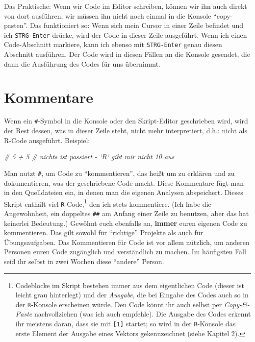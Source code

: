 \documentclass[12pt,]{tufte-book}
\newenvironment{Shaded}{\begin{snugshade}}{\end{snugshade}}
\newcommand{\CommentTok}[1]{\textcolor[rgb]{0.56,0.35,0.01}{\textit{#1}}}
\theoremstyle{definition}
\theoremstyle{definition}
\theoremstyle{definition}
\theoremstyle{remark}
\begin{document}
Das Praktische: Wenn wir Code im Editor schreiben, können wir ihn auch
direkt von dort ausführen; wir müssen ihn nicht noch einmal in die
Konsole ``copy-pasten''. Das funktioniert so: Wenn sich mein Cursor in
einer Zeile befindet und ich \texttt{STRG-Enter} drücke, wird der Code
in dieser Zeile ausgeführt. Wenn ich einen Code-Abschnitt markiere, kann
ich ebenso mit \texttt{STRG-Enter} genau diesen Abschnitt ausführen. Der
Code wird in diesen Fällen an die Konsole gesendet, die dann die
Ausführung des Codes für uns übernimmt.

\section{Kommentare}\label{kommentare}

Wenn ein \texttt{\#}-Symbol in die Konsole oder den Skript-Editor
geschrieben wird, wird der Rest dessen, was in dieser Zeile steht, nicht
mehr interpretiert, d.h.: nicht als R-Code ausgeführt. Beispiel:

\begin{Shaded}
\begin{Highlighting}[]

\CommentTok{# 5 + 5 }
\CommentTok{# nichts ist passiert - `R` gibt mir nicht 10 aus}
\end{Highlighting}
\end{Shaded}

Man nutzt \texttt{\#}, um Code zu ``kommentieren'', das heißt um zu
erklären und zu dokumentieren, was der geschriebene Code macht. Diese
Kommentare fügt man in den Quelldateien ein, in denen man die eigenen
Analysen abspeichert. Dieses Skript enthält viel
\texttt{R}-Code,\footnote{Codeblöcke im Skript bestehen immer aus dem
  eigentlichen Code (dieser ist leicht grau hinterlegt) und der
  \emph{Ausgabe}, die bei Eingabe des Codes auch so in der
  \texttt{R}-Konsole erscheinen würde. Den Code könnt ihr auch selbst
  per \emph{Copy-\&-Paste} nachvollziehen (was ich auch empfehle). Die
  Ausgabe des Codes erkennt ihr meistens daran, dass sie mit
  \texttt{{[}1{]}} startet; so wird in der \texttt{R}-Konsole das erste
  Element der Ausgabe eines Vektors gekennzeichnet (siehe Kapitel 2).}
den ich stets kommentiere. (Ich habe die Angewohnheit, ein doppeltes
\texttt{\#\#} am Anfang einer Zeile zu benutzen, aber das hat keinerlei
Bedeutung.) Gewöhnt euch ebenfalls an, \textbf{immer} euren eigenen Code
zu kommentieren. Das gilt sowohl für ``richtige'' Projekte als auch für
Übungsaufgaben. Das Kommentieren für Code ist vor allem nützlich, um
anderen Personen euren Code zugänglich und verständlich zu machen. Im
häufigsten Fall seid ihr selbst in zwei Wochen diese ``andere'' Person.
\end{document}
